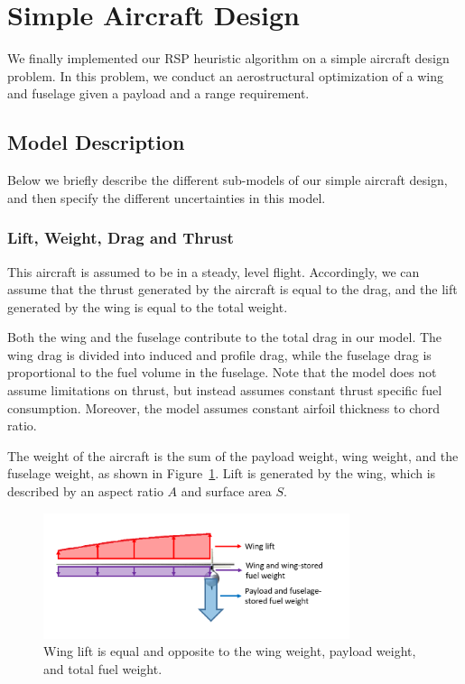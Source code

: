 \section{Simple Aircraft Design}

We finally implemented our RSP heuristic algorithm on a simple aircraft design problem. 
In this problem, we conduct an aerostructural optimization of a wing and fuselage given a payload and a range requirement. 


\subsection{Model Description}

Below we briefly describe the different sub-models of our simple aircraft design, and then specify the different uncertainties in this model.

\subsubsection{Lift, Weight, Drag and Thrust}
This aircraft is assumed to be in a steady, level flight. 
Accordingly, we can assume that the thrust generated by the aircraft is equal to the drag,
and the lift generated by the wing is equal to the total weight.

Both the wing and the fuselage contribute to the total drag in our model.
The wing drag is divided into induced and profile drag, while the fuselage drag is proportional to the fuel volume in the fuselage.
Note that the model does not assume limitations on thrust, but instead assumes constant thrust specific fuel consumption. Moreover, the model assumes constant airfoil thickness to chord ratio.

The weight of the aircraft is the sum of the payload weight, wing weight, and
the fuselage weight, as shown in Figure~\ref{fig:liftweight}. Lift is generated by the wing,
which is described by an aspect ratio $A$ and surface area $S$.

\begin{figure}[ht]
\centering
\includegraphics[width=0.8\textwidth]{liftweight.PNG}
\caption{\label{fig:liftweight} Wing lift is equal and opposite to the wing weight, payload weight, and total fuel weight.}
\end{figure}


